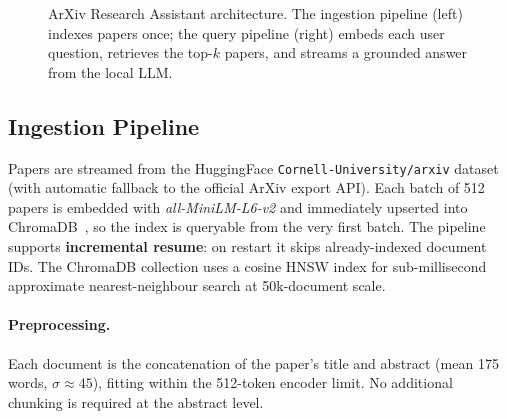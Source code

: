 \documentclass[paper=a4, fontsize=11pt]{scrartcl}
\begin{document}
\begin{figure}[h]
\caption{ArXiv Research Assistant architecture. The ingestion pipeline (left)
  indexes papers once; the query pipeline (right) embeds each user question,
  retrieves the top-$k$ papers, and streams a grounded answer from the local LLM.}
\label{fig:arch}
\end{figure}

\subsection{Ingestion Pipeline}
Papers are streamed from the HuggingFace \texttt{Cornell-University/arxiv}
dataset (with automatic fallback to the official ArXiv export API).
Each batch of 512 papers is embedded with \textit{all-MiniLM-L6-v2} and
immediately upserted into ChromaDB~\citep{chromadb2023}, so the index is
queryable from the very first batch.
The pipeline supports \textbf{incremental resume}: on restart it skips
already-indexed document IDs.
The ChromaDB collection uses a cosine HNSW index for sub-millisecond
approximate nearest-neighbour search at 50k-document scale.

\paragraph{Preprocessing.}
Each document is the concatenation of the paper's title and abstract (mean
175 words, $\sigma \approx 45$), fitting within the 512-token encoder limit.
No additional chunking is required at the abstract level.
\end{document}
